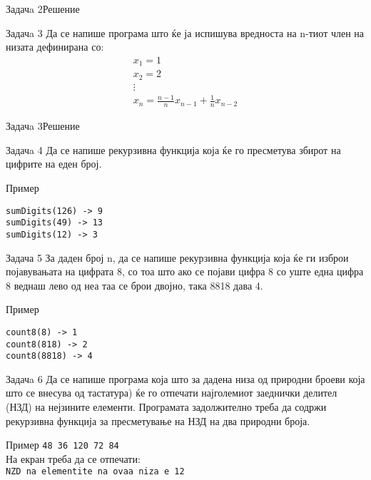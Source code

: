 \begin{frame}[fragile]{Задачa 2}{Решение} 

\end{frame}

\begin{frame}{Задачa 3}
Да се напише програма што ќе ја испишува вредноста на n-тиот член на низата дефинирана со:
\[
   \begin{array}{l}
   x_1 = 1\\
   x_2 = 2\\ 
   \vdots\\
   x_n = \frac{n - 1}{n}x_{n - 1} + \frac{1}{n}x_{n - 2}
   \end{array}
\]
\end{frame}


\begin{frame}[fragile]{Задачa 3}{Решение}

\end{frame}


\begin{frame}[fragile]{Задачa 4}
Да се напише рекурзивна функција која ќе го пресметува збирот на цифрите на еден
број.
\begin{exampleblock}{Пример}
\begin{verbatim}
sumDigits(126) -> 9
sumDigits(49) -> 13
sumDigits(12) -> 3
\end{verbatim}
\end{exampleblock}
\pause

\end{frame}

\begin{frame}[fragile]{Задача 5}
За даден број n, да се напише рекурзивна функција која ќе ги изброи појавувањата
на цифрата 8, со тоа што ако се појави цифра 8 со уште една цифра 8 веднаш лево
од неа таа се брои двојно, така 8818 дава 4.
\begin{exampleblock}{Пример}
\begin{verbatim}
count8(8) -> 1
count8(818) -> 2
count8(8818) -> 4
\end{verbatim}
\end{exampleblock}
\pause

\end{frame}


\begin{frame}{Задачa 6}
Да се напише програма која што за дадена низа од природни броеви  која што се
внесува од тастатура) ќе го отпечати најголемиот заеднички делител (НЗД) на
нејзините елементи.  Програмата задолжително треба да содржи рекурзивна функција
за пресметување на НЗД на два природни броја.
\begin{exampleblock}{Пример}
\texttt{48 36 120 72 84}\\
На екран треба да се отпечати:\\
\texttt{NZD na elementite na ovaa niza e 12}
\end{exampleblock}
\end{frame}

